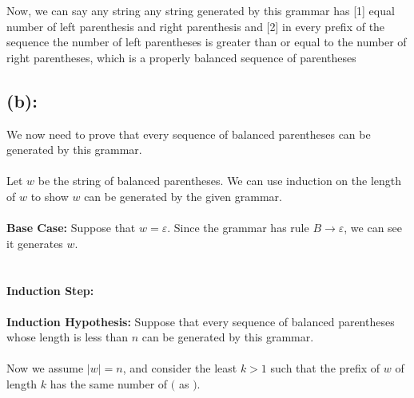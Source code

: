 \documentclass [9 pt]{article}
\theoremstyle{definition}
\begin{document}
Now, we can say any string any string generated by this grammar has [1] equal number of left parenthesis and right parenthesis and [2] in every prefix of the sequence the number of left parentheses is greater than or equal to the number of right parentheses, which is a properly balanced sequence of parentheses






















\newpage

\subsection*{(b):}
We now need to prove that every sequence of balanced parentheses can be generated by this grammar.\\
\\
Let $w$ be the string of balanced parentheses. We can use induction on the length of $w$ to show $w$ can be generated by the given grammar.\\
\\
\textbf{Base Case:} Suppose that $w = \varepsilon$. Since the grammar has rule $B \to \varepsilon$, we can see it generates $w$.\\
\\
\\
\textbf{Induction Step:} \\\\
\textbf{Induction Hypothesis:}
Suppose that every sequence of balanced parentheses whose length is less than $n$ can be generated by this grammar.
\\
\\
Now we assume $|w| = n$, and consider the least $k > 1$ such that the prefix of $w$ of length $k$ has the same number of $($ as $)$.
\end{document}
